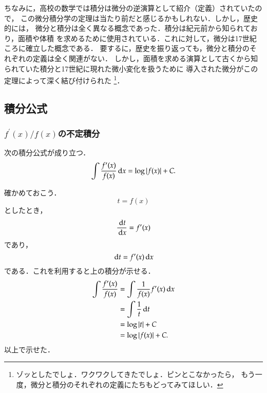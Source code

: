         ちなみに，高校の数学では積分は微分の逆演算として紹介（定義）されていたので，
        この微分積分学の定理は当たり前だと感じるかもしれない．しかし，歴史的には，
        微分と積分は全く異なる概念であった．積分は紀元前から知られており，面積や体積
        を求めるために使用されている．これに対して，微分は17世紀ころに確立した概念である．
        要するに，歴史を振り返っても，微分と積分のそれぞれの定義は全く関連がない．
        しかし，面積を求める演算として古くから知られていた積分と17世紀に現れた微小変化を扱うために
        導入された微分がこの定理によって深く結び付けられた
        \footnote{
            ゾッとしたでしょ．ワクワクしてきたでしょ．ピンとこなかったら，
            もう一度，微分と積分のそれぞれの定義にたちもどってみてほしい．
        }．


        \subsection{積分公式}
        \subsubsection{$f^{\prime}(x)/f(x)$の不定積分}
        次の積分公式が成り立つ．
        \begin{align}
            \int \frac{f^{\prime}(x)}{f(x)} \,\mathrm{d} x= \log |f(x)| + C.
        \end{align}

        確かめておこう．
        \[
            t=f(x)
        \]
        としたとき，
        \[
            \frac{\,\mathrm{d} t}{\,\mathrm{d} x} = f^{\prime}(x)
        \]
        であり，
        \[
            \,\mathrm{d} t = f^{\prime}(x) \,\mathrm{d} x
        \]
        である．これを利用すると上の積分が示せる．
        \begin{align*}
            \int \frac{f^{\prime}(x)}{f(x)} &= \int \frac{1}{f(x)} f^{\prime}(x) \,\mathrm{d} x \\
                                            &= \int \frac{1}{t} \,\mathrm{d} t \\
                                            &= \log |t| + C \\
                                            &= \log |f(x)| + C.
        \end{align*}
        以上で示せた．


